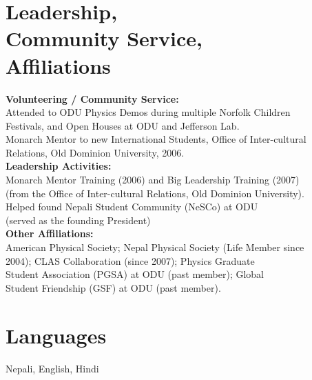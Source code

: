\documentclass[line,margin]{res}
\begin{document}
\begin{resume}
 
\section{Leadership, \\ Community Service, \\ Affiliations} %
  {\bf Volunteering / Community Service: } \\
  Attended to ODU Physics Demos during multiple Norfolk Children \\
  \hspace*{3 mm} Festivals, and Open Houses at ODU and Jefferson Lab. \\
  Monarch Mentor to new International Students, Office of Inter-cultural \\
  \hspace*{3 mm} Relations, Old Dominion University, 2006.\\
  {\bf Leadership Activities: } \\
  Monarch Mentor Training (2006) and Big Leadership Training (2007) \\
  \hspace*{3 mm} (from the Office of Inter-cultural Relations, Old Dominion University).\\
  Helped found Nepali Student Community (NeSCo) at ODU \\
  \hspace*{3 mm} (served as the founding President) \\
	{\bf Other Affiliations: } \\
	American Physical Society; Nepal Physical Society (Life Member since \\
	\hspace*{3 mm} 2004); CLAS Collaboration (since 2007); Physics Graduate \\
	\hspace*{3 mm} Student Association (PGSA) at ODU (past member); Global \\
	\hspace*{3 mm} Student Friendship (GSF) at ODU (past member).

 
\section{Languages} Nepali, English, Hindi
\end{resume}
\end{document}

